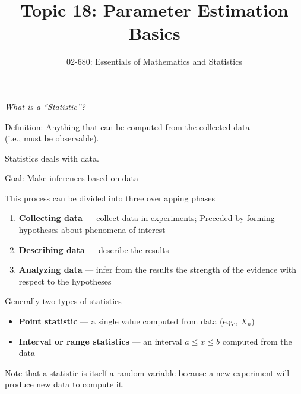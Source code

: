 

\title{Topic 18: Parameter Estimation Basics}
\author{02-680: Essentials of Mathematics and Statistics}


\maketitle


\emph{What is a ``Statistic''?}
\begin{center}
Definition: Anything that can be computed from the collected data\\ (i.e., must be observable).
\end{center}

Statistics deals with data.

Goal: Make inferences based on data

This process can be divided into three overlapping phases
\begin{enumerate}
\item \textbf{Collecting data} --- collect data in experiments; Preceded by forming hypotheses about phenomena of interest 
\item \textbf{Describing data} --- describe the results
\item \textbf{Analyzing data} --- infer from the results the strength of the evidence with respect to the hypotheses
\end{enumerate}

Generally two types of statistics
\begin{itemize}
\item[] \textbf{Point statistic} --- a single value computed from data (e.g., $\overline{X_n}$)
\item[] \textbf{Interval or range statistics} ---  an interval $a\le x \le b$ computed from the data
\end{itemize} 

Note that a statistic is itself a random variable 
because a new experiment will produce new data to compute it.


